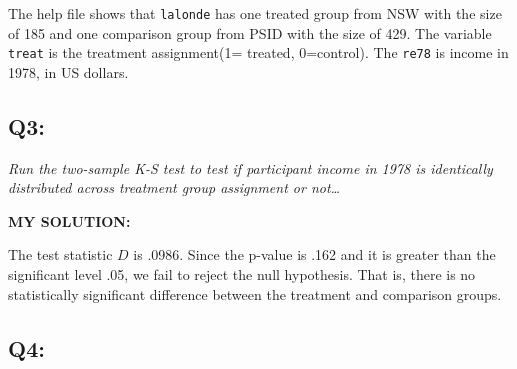 \documentclass[
]{article}
\newenvironment{Shaded}{\begin{snugshade}}{\end{snugshade}}
\newcommand{\CommentTok}[1]{\textcolor[rgb]{0.56,0.35,0.01}{\textit{#1}}}
\newcommand{\DecValTok}[1]{\textcolor[rgb]{0.00,0.00,0.81}{#1}}
\newcommand{\ErrorTok}[1]{\textcolor[rgb]{0.64,0.00,0.00}{\textbf{#1}}}
\newcommand{\FloatTok}[1]{\textcolor[rgb]{0.00,0.00,0.81}{#1}}
\newcommand{\FunctionTok}[1]{\textcolor[rgb]{0.00,0.00,0.00}{#1}}
\newcommand{\NormalTok}[1]{#1}
\newcommand{\OtherTok}[1]{\textcolor[rgb]{0.56,0.35,0.01}{#1}}
\newcommand{\SpecialCharTok}[1]{\textcolor[rgb]{0.00,0.00,0.00}{#1}}
\begin{document}
The help file shows that \texttt{lalonde} has one treated group from NSW
with the size of 185 and one comparison group from PSID with the size of
429. The variable \texttt{treat} is the treatment assignment(1= treated,
0=control). The \texttt{re78} is income in 1978, in US dollars.

\hypertarget{q3}{%
\subsection{Q3:}\label{q3}}

\emph{Run the two-sample K-S test to test if participant income in 1978
is identically distributed across treatment group assignment or
not\ldots{}}

\textbf{MY SOLUTION:}

\begin{Shaded}
\end{Shaded}

The test statistic \(D\) is .0986. Since the p-value is .162 and it is
greater than the significant level .05, we fail to reject the null
hypothesis. That is, there is no statistically significant difference
between the treatment and comparison groups.

\hypertarget{q4}{%
\subsection{Q4:}\label{q4}}
\end{document}
